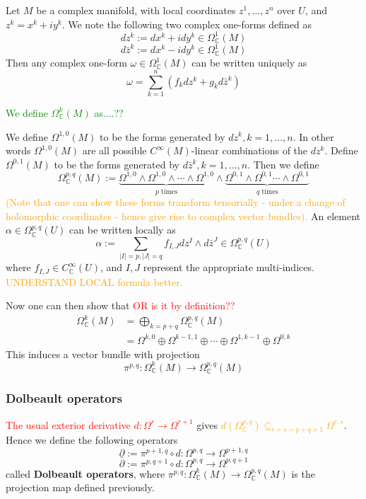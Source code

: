 \documentclass[a4paper]{article}
\theoremstyle{definition} \newtheorem*{definition}{Definition}
\theoremstyle{definition} \newtheorem*{definitions}{Definitions}
\theoremstyle{plain} \newtheorem{theorem}{Theorem}[section]
\theoremstyle{plain} \newtheorem{proposition}[theorem]{Proposition}
\theoremstyle{plain} \newtheorem{corollary}[theorem]{Corollary}
\theoremstyle{plain} \newtheorem{lemma}[theorem]{Lemma}
\theoremstyle{plain} \newtheorem{example}[theorem]{Example}
\newcommand{\checkCorrect}[1]{\textcolor{red}{#1}}
\newcommand{\understandBetter}[1]{\textcolor{orange}{#1}}
\newcommand{\finish}[1]{\textcolor{green}{#1}}
\newcommand{\defn}[1]{\textbf{#1}}
\newcommand{\complexnos}{\mathbb{C}}
\newcommand{\smooth}{C^\infty}
\begin{document}
Let $M$ be a complex manifold, with local coordinates $z^1, \ldots, z^n$ over $U$, and $z^k=x^k+iy^k$. We note the following two complex one-forms defined as
$$dz^k := dx^k + i dy^k \in \Omega^1_\complexnos (M)$$
$$d\bar{z}^k := dx^k - i dy^k \in \Omega^1_\complexnos (M)$$
Then any complex one-form $\omega\in \Omega^1_\complexnos (M)$ can be written uniquely as 
$$\omega = \sum_{k=1}^n (f_kdz^k + g_kd\bar{z}^k)$$

\finish{We define $\Omega^k_\complexnos(M)$ as....??}

We define $\Omega^{1, 0}(M)$ to be the forms generated by $dz^k, k=1, \ldots, n$. In other words $\Omega^{1, 0}(M)$ are all possible $\smooth(M)$-linear combinations of the $dz^k$. Define $\Omega^{0, 1}(M)$ to be the forms generated by $d\bar{z}^k, k=1, \ldots, n$. 
Then we define 
$$\Omega^{p, q}_\complexnos (M) := \underbrace{\Omega^{1, 0} \wedge \Omega^{1, 0} \wedge \cdots \wedge \Omega^{1, 0}}_{p \text{ times}} \wedge \underbrace{\Omega^{0, 1} \wedge \Omega^{0, 1} \cdots \wedge \Omega^{0, 1}}_{q \text{ times}}$$
\understandBetter{(Note that one can show these forms transform tensorially - under a change of holomorphic coordinates - hence give rise to complex vector bundles).} An element $\alpha\in \Omega^{p,q}_\complexnos(U)$ can be written locally as 
$$\alpha := \sum_{|I|=p, |J|=q} f_{I,J} dz^I \wedge d\bar{z}^J \in \Omega^{p,q}_\complexnos(U)$$
where $f_{I, J}\in \smooth_\complexnos(U)$, and $I, J$ represent the appropriate multi-indices. 
\understandBetter{UNDERSTAND LOCAL formula better.}

Now one can then show that \checkCorrect{OR is it by definition??}
\begin{align*}
\Omega^k_\complexnos(M) & =\bigoplus_{k=p+q} \Omega^{p, q}_\complexnos (M) \\
& = \Omega^{k, 0}\oplus\Omega^{k-1, 1}\oplus \cdots \oplus \Omega^{1, k-1}\oplus \Omega^{0, k}
\end{align*}
This induces a vector bundle with projection 
$$\pi^{p,q}:\Omega^k_\complexnos (M)\to \Omega^{p, q}_\complexnos(M)$$

\subsubsection{Dolbeault operators}
\checkCorrect{The usual exterior derivative $d:\Omega^r \to \Omega^{r+1}$} gives \understandBetter{$d(\Omega^{p,q}_\complexnos)\subseteq_{r+s=p+q+1} \Omega^{r, s}$}. Hence we define the following operators
$$\partial := \pi^{p+1, q}\circ d:\Omega^{p,q}\to \Omega^{p+1, q}$$
$$\bar{\partial} := \pi^{p, q+1}\circ d:\Omega^{p,q}\to \Omega^{p, q+1}$$
called \defn{Dolbeault operators}, where $\pi^{p, q}:\Omega^k_\complexnos (M)\to \Omega^{p, q}_\complexnos(M)$ is the projection map defined previously. 
\end{document}
